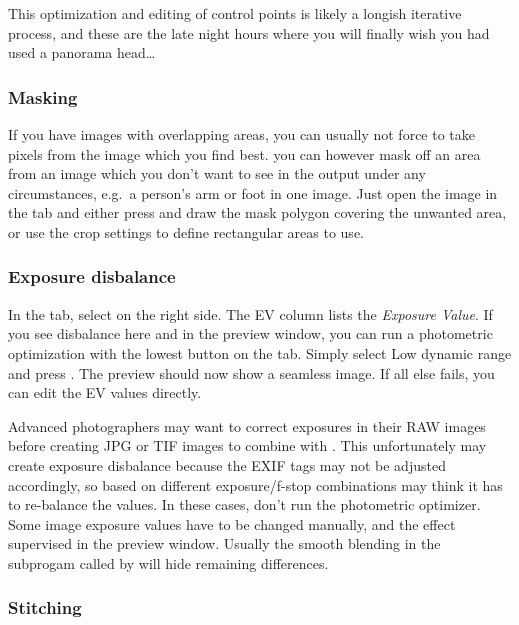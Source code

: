 This optimization and editing of control points is likely a longish
iterative process, and these are the late night hours where you will
finally wish you had used a panorama head\ldots



\subsubsection{Masking}
\label{sec:landscapes:Masking}

If you have images with overlapping areas, you can usually not force
 to take pixels from the image which you find best. you can
however mask off an area from an image which you don't want to see in
the output under any circumstances, e.g.\ a person's arm or foot in
one image. Just open the image in the  tab and either press
 and draw the mask polygon covering the unwanted
area, or use the crop settings to define rectangular areas to use.

\subsubsection{Exposure disbalance}
\label{sec:landscapes:Exposure}
In the  tab, select  on the right
side. The EV column lists the \emph{Exposure Value}. If you see disbalance
here and in the preview window, you can run a photometric optimization
with the lowest button on the  tab. Simply select Low dynamic
range and press . The preview should now show a seamless
image. If all else fails, you can edit the EV values directly.

Advanced photographers may want to correct exposures in their RAW
images before creating JPG or TIF images to combine with
. This unfortunately may create exposure disbalance
because the EXIF tags may not be adjusted accordingly, so based on
different exposure/f-stop combinations  may think it
has to re-balance the values. In these cases, don't run the
photometric optimizer. Some image exposure values have to be changed
manually, and the effect supervised in the preview window. Usually the
smooth blending in the subprogam  called by
 will hide remaining differences.



\subsubsection{Stitching}
\label{sec:landscapes:stitching}

